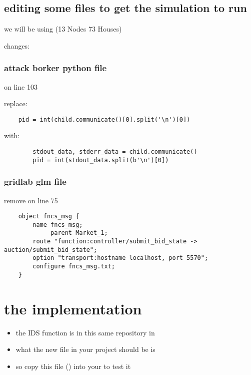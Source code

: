 \documentclass{masterthesis-uc2-en}
\begin{document}
	\subsection{editing some files to get the simulation to run}



	we will be using (13 Nodes 73 Houses)

	changes:
	\subsubsection{attack borker python file}
	on line 103  

	replace:
	\begin{lstlisting}
	pid = int(child.communicate()[0].split('\n')[0])
	\end{lstlisting}
	with:

	\begin{lstlisting}
		stdout_data, stderr_data = child.communicate()
		pid = int(stdout_data.split(b'\n')[0])
	\end{lstlisting}


	\subsubsection{gridlab glm file}
	remove on line	75
	\begin{lstlisting}
	object fncs_msg {
     	name fncs_msg;
 	 		 parent Market_1;
     	route "function:controller/submit_bid_state -> auction/submit_bid_state";
     	option "transport:hostname localhost, port 5570";
     	configure fncs_msg.txt;
	}
	\end{lstlisting}




	
	\section{the implementation}

	\begin{itemize}
		\item the IDS function is in this same repository in 
		\item what the new  file in your project should be is 
		\item so copy this file () into your  to test it
	\end{itemize}
\end{document}
